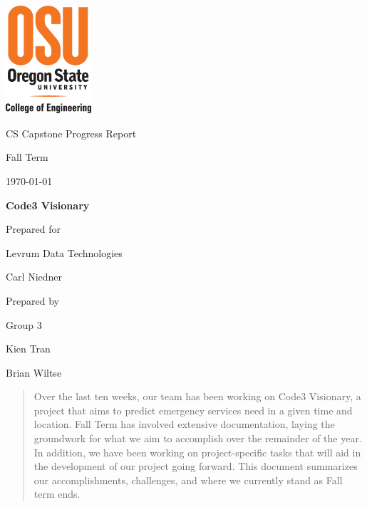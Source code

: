 \documentclass[onecolumn, draftclsnofoot,10pt, compsoc]{IEEEtran}
\def \CapstoneTeamName{   The Visionaries}
\def \CapstoneTeamNumber{   3}
\def \GroupMemberOne{     Kien Tran}
\def \GroupMemberTwo{       Brian Wiltse}
\def \CapstoneProjectName{    Code3 Visionary}
\def \CapstoneSponsorCompany{ Levrum Data Technologies}
\def \CapstoneSponsorPerson{  Carl Niedner}
\def \DocType{    
        Progress Report
        }
\newcommand{\NameSigPair}[1]{\par
\makebox[2.75in][r]{#1} \hfil   \makebox[3.25in]{\makebox[2.25in]{\hrulefill} \hfill    \makebox[.75in]{\hrulefill}}
\par\vspace{-12pt} \textit{\tiny\noindent
\makebox[2.75in]{} \hfil    \makebox[3.25in]{\makebox[2.25in][r]{Signature} \hfill  \makebox[.75in][r]{Date}}}}
\renewcommand{\NameSigPair}[1]{#1}
\begin{document}
\begin{titlepage}
    \begin{singlespace}
      \includegraphics[height=4cm]{coe_v_spot1}
        \hfill 
        \par\vspace{.2in}
        \centering
        \scshape{
            \huge CS Capstone \DocType \par
            \large{Fall Term}\par
            {\large\today}\par
            \vspace{.5in}
            \textbf{\Huge\CapstoneProjectName}\par
            \vfill
            {\large Prepared for}\par
            \Huge \CapstoneSponsorCompany\par
            \vspace{5pt}
            {\Large\NameSigPair{\CapstoneSponsorPerson}\par}
            {\large Prepared by }\par
            Group\CapstoneTeamNumber\par
            \vspace{5pt}
            {\Large
                \NameSigPair{\GroupMemberOne}\par
                \NameSigPair{\GroupMemberTwo}\par
            }
            \vspace{20pt}
        }
        \begin{abstract}
                Over the last ten weeks, our team has been working on Code3 Visionary, a project that aims to predict emergency services need in a given time and location. 
                Fall Term has involved extensive documentation, laying the groundwork for what we aim to accomplish over the remainder of the year.
                In addition, we have been working on project-specific tasks that will aid in the development of our project going forward.
                This document summarizes our accomplishments, challenges, and where we currently stand as Fall term ends.
        \end{abstract}
    \end{singlespace}
\end{titlepage}
\newpage
{}
\tableofcontents
\clearpage
\end{document}
